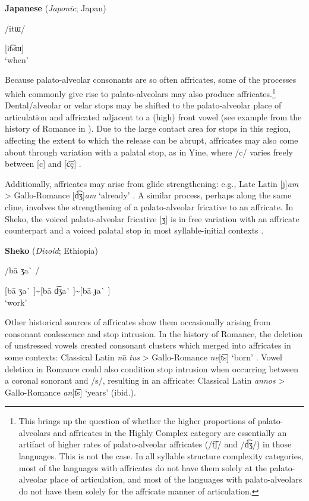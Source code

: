 \ea\label{ex:4.45}
  \textbf{Japanese} (\textit{Japonic}; Japan)

/itɯ/

[it͡sɯ]\\
\glt ‘when’
\citep[22]{Tsujimura2013}
\z

  Because palato-alveolar consonants are so often affricates, some of the processes which commonly give rise to palato-alveolars may also produce affricates.\footnote{{This brings up the question of whether the higher proportions of palato-alveolars and affricates in the Highly Complex category are essentially an artifact of higher rates of palato-alveolar affricates (/t͡ʃ/ and /d͡ʒ/) in those languages. This is not the case. In all syllable structure complexity categories, most of the languages with affricates do not have them solely at the palato-alveolar place of articulation, and most of the languages with palato-alveolars do not have them solely for the affricate manner of articulation.}} Dental/alveolar or velar stops may be shifted to the palato-alveolar place of articulation and affricated adjacent to a (high) front vowel (see example from the history of Romance in ). Due to the large contact area for stops in this region, affecting the extent to which the release can be abrupt, affricates may also come about through variation with a palatal stop, as in Yine, where /c/ varies freely between [c] and [c͡ç] \citep[17-18]{Hanson2010}.

  Additionally, affricates may arise from glide strengthening: e.g., Late Latin [j]\textit{am} > Gallo-Romance [d͡ʒ]\textit{am} ‘already’ \citep[132]{Berns2013}. A similar process, perhaps along the same cline, involves the strengthening of a palato-alveolar fricative to an affricate. In Sheko, the voiced palato-alveolar fricative [ʒ] is in free variation with an affricate counterpart and a voiced palatal stop in most syllable-initial contexts .

\ea\label{ex:4.46}
  \textbf{Sheko} (\textit{Dizoid}; Ethiopia)

/ba\={} ʒa\`{} /

[ba\={} ʒa\`{} ]{\textasciitilde}[ba\={} d͡ʒa\`{} ]{\textasciitilde}[ba\={} ɟa\`{} ]\\
\glt ‘work’
\citep[86]{Hellenthal2010}
\z

  Other historical sources of affricates show them occasionally arising from consonant coalescence and stop intrusion. In the history of Romance, the deletion of unstressed vowels created consonant clusters which merged into affricates in some contexts: Classical Latin \textit{na}\textsf{\={} }\textit{tus} > Gallo-Romance \textit{ne}[t͡s] ‘born’ \citep[128]{Berns2013}. Vowel deletion in Romance could also condition stop intrusion when occurring between a coronal sonorant and /s/, resulting in an affricate: Classical Latin \textit{annos} > Gallo-Romance \textit{an}[t͡s] ‘years’ (ibid.).

